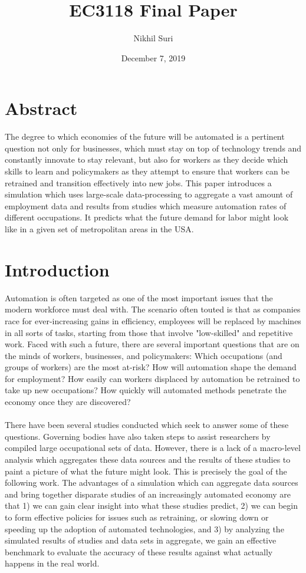 \documentclass[10pt]{article}
\title{EC3118 Final Paper}
\author{Nikhil Suri}
\date{December 7, 2019}
\begin{document}
\maketitle

\section{Abstract}
The degree to which economies of the future will be automated is a pertinent question not only for businesses, which must stay on top of technology trends and constantly innovate to stay relevant, but also for workers as they decide which skills to learn and policymakers as they attempt to ensure that workers can be retrained and transition effectively into new jobs. This paper introduces a simulation which uses large-scale data-processing to aggregate a vast amount of employment data and results from studies which measure automation rates of different occupations. It predicts what the future demand for labor might look like in a given set of metropolitan areas in the USA. 

\section{Introduction}
Automation is often targeted as one of the most important issues that the modern workforce must deal with. The scenario often touted is that as companies race for ever-increasing gains in efficiency, employees will be replaced by machines in all sorts of tasks, starting from those that involve "low-skilled" and repetitive work. Faced with such a future, there are several important questions that are on the minds of workers, businesses, and policymakers: Which occupations (and groups of workers) are the most at-risk? How will automation shape the demand for employment? How easily can workers displaced by automation be retrained to take up new occupations? How quickly will automated methods penetrate the economy once they are discovered?\\\\ There have been several studies conducted which seek to answer some of these questions. Governing bodies have also taken steps to assist researchers by compiled large occupational sets of data. However, there is a lack of a macro-level analysis which aggregates these data sources and the results of these studies to paint a picture of what the future might look. This is precisely the goal of the following work. The advantages of a simulation which can aggregate data sources and bring together disparate studies of an increasingly automated economy are that 1) we can gain clear insight into what these studies predict, 2) we can begin to form effective policies for issues such as retraining, or slowing down or speeding up the adoption of automated technologies, and 3) by analyzing the simulated results of studies and data sets in aggregate, we gain an effective benchmark to evaluate the accuracy of these results against what actually happens in the real world.
\end{document}
